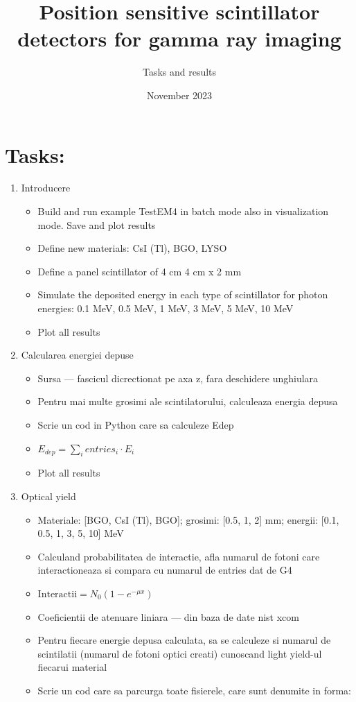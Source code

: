 \documentclass{article}
\title{Position sensitive scintillator detectors for gamma ray imaging}
\author{Tasks and results}
\date{November 2023}
\begin{document}
\maketitle

\section{Tasks:}

\begin{enumerate}
    \item Introducere
        \begin{itemize}
            \item Build and run example TestEM4 in batch mode also in visualization mode. Save and plot results
            \item Define new materials: CsI (Tl), BGO, LYSO
            \item Define a panel scintillator of 4 cm 4 cm x 2 mm
            \item Simulate the deposited energy in each type of scintillator for photon energies: 0.1 MeV, 0.5 MeV, 1 MeV, 3 MeV, 5 MeV, 10 MeV
            \item Plot all results
        \end{itemize}
    \item Calcularea energiei depuse
        \begin{itemize}
            \item Sursa --- fascicul dicrectionat pe axa z, fara deschidere unghiulara
            \item Pentru mai multe grosimi ale scintilatorului, calculeaza energia depusa
            \item Scrie un cod in Python care sa calculeze Edep
            \item $E_{dep} = \sum_{i} entries_i \cdot E_i$
            \item Plot all results
        \end{itemize}
    \item Optical yield
        \begin{itemize}
            \item Materiale: [BGO, CsI (Tl), BGO]; grosimi: [0.5, 1, 2] mm; energii: [0.1, 0.5, 1, 3, 5, 10] MeV
            \item Calculand probabilitatea de interactie, afla numarul de fotoni care interactioneaza si compara cu numarul de entries dat de G4
            \item $\text{Interactii} = N_0(1-e^{-\mu x})$
            \item Coeficientii de atenuare liniara --- din baza de date nist xcom
            \item Pentru fiecare energie depusa calculata, sa se calculeze si numarul de scintilatii (numarul de fotoni optici creati) cunoscand light yield-ul fiecarui material
            \item Scrie un cod care sa parcurga toate fisierele, care sunt denumite in forma:
            

\end{itemize}
\end{enumerate}
\end{document}
